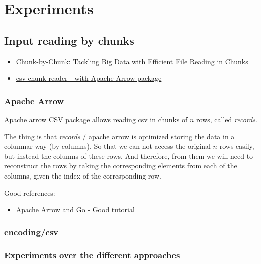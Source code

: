 \newpage
\section{Experiments}

\subsection{Input reading by chunks}\label{input-reading}

\begin{itemize}
  \item \href{https://medium.com/@anuragv.1020/chunk-by-chunk-tackling-big-data-with-efficient-file-reading-in-chunks-c6f7cf153ccd}{Chunk-by-Chunk: Tackling Big Data with Efficient File Reading in Chunks}
  \item \href{https://pkg.go.dev/github.com/apache/arrow/go/arrow/csv#NewReader}{csv chunk reader - with Apache Arrow package}
\end{itemize}

\subsubsection{Apache Arrow}

\href{https://pkg.go.dev/github.com/apache/arrow/go/v12@v12.0.1/arrow/csv}{Apache arrow CSV}
package allows reading csv in chunks of $n$ rows, called \emph{records}.

The thing is that \emph{records} / apache arrow is optimized storing the data in a columnar way (by columns). So that we can not access the original $n$ rows easily, but instead the columns of these rows. And therefore, from them we will need to reconstruct the rows by taking the corresponding elements from each of the columns, given the index of the corresponding row.

Good references:
\begin{itemize}
  \item \href{https://www.apachecon.com/acna2022/slides/01_Topol_Arrow_and_Go.pdf}{Apache Arrow and Go - Good tutorial}
\end{itemize}


\subsubsection{encoding/csv}

\subsubsection{Experiments over the different approaches}

